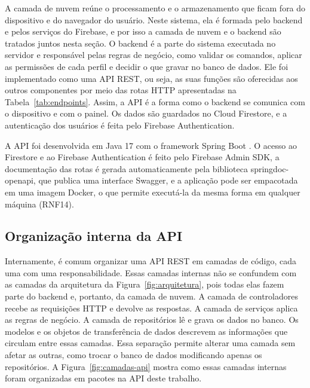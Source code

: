 A camada de nuvem reúne o processamento e o armazenamento que ficam fora do dispositivo e do navegador do usuário. Neste sistema, ela é formada pelo backend e pelos serviços do Firebase, e por isso a camada de nuvem e o backend são tratados juntos nesta seção. O backend é a parte do sistema executada no servidor e responsável pelas regras de negócio, como validar os comandos, aplicar as permissões de cada perfil e decidir o que gravar no banco de dados. Ele foi implementado como uma API REST, ou seja, as suas funções são oferecidas aos outros componentes por meio das rotas HTTP apresentadas na Tabela~\ref{tab:endpoints}. Assim, a API é a forma como o backend se comunica com o dispositivo e com o painel. Os dados são guardados no Cloud Firestore, e a autenticação dos usuários é feita pelo Firebase Authentication.

A API foi desenvolvida em Java 17 com o framework Spring Boot \cite{springboot2026}. O acesso ao Firestore e ao Firebase Authentication é feito pelo Firebase Admin SDK, a documentação das rotas é gerada automaticamente pela biblioteca springdoc-openapi, que publica uma interface Swagger, e a aplicação pode ser empacotada em uma imagem Docker, o que permite executá-la da mesma forma em qualquer máquina (RNF14).

\subsection{Organização interna da API}

Internamente, é comum organizar uma API REST em camadas de código, cada uma com uma responsabilidade. Essas camadas internas não se confundem com as camadas da arquitetura da Figura~\ref{fig:arquitetura}, pois todas elas fazem parte do backend e, portanto, da camada de nuvem. A camada de controladores recebe as requisições HTTP e devolve as respostas. A camada de serviços aplica as regras de negócio. A camada de repositórios lê e grava os dados no banco. Os modelos e os objetos de transferência de dados descrevem as informações que circulam entre essas camadas. Essa separação permite alterar uma camada sem afetar as outras, como trocar o banco de dados modificando apenas os repositórios. A Figura~\ref{fig:camadas-api} mostra como essas camadas internas foram organizadas em pacotes na API deste trabalho.

